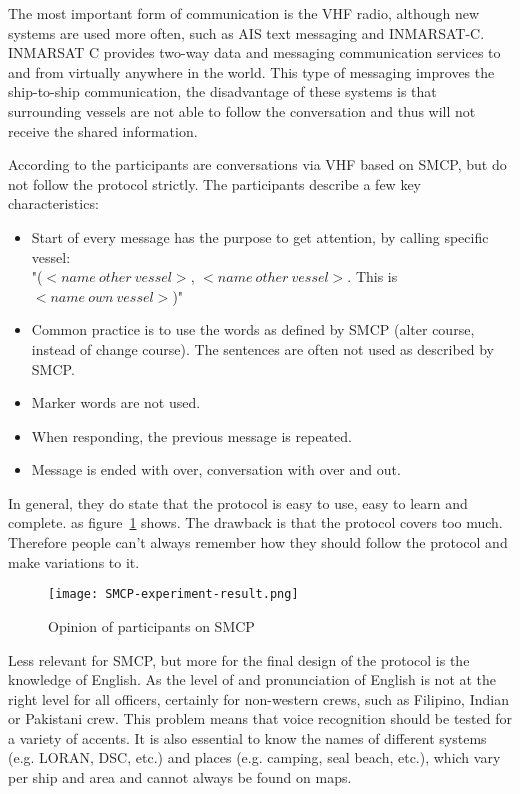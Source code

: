 The most important form of communication is the VHF radio, although new systems are used more often, such as \ac{AIS} text messaging and INMARSAT-C. INMARSAT C provides two-way data and messaging communication services to and from virtually anywhere in the world. This type of messaging improves the ship-to-ship communication, the disadvantage of these systems is that surrounding vessels are not able to follow the conversation and thus will not receive the shared information.

According to the participants are conversations via \ac{VHF} based on \ac{SMCP}, but do not follow the protocol strictly. The participants describe a few key characteristics:
\begin{itemize}
	\item Start of every message has the purpose to get attention, by calling specific vessel: \\ "($<name~other~vessel>$, $<name~other~vessel>$. This is $<name~own~vessel>$)"
	\item Common practice is to use the words as defined by \ac{SMCP} (alter course, instead of change course). The sentences are often not used as described by \ac{SMCP}.
	\item Marker words are not used.
	\item When responding, the previous message is repeated.
	\item Message is ended with over, conversation with over and out.
\end{itemize}
In general, they do state that the protocol is easy to use, easy to learn and complete. as figure~\ref{fig:SMCP-experiment-result} shows. The drawback is that the protocol covers too much. Therefore people can't always remember how they should follow the protocol and make variations to it. 

\begin{figure}[h]
	\centering
	\texttt{[image: SMCP-experiment-result.png]}
	\caption{Opinion of participants on SMCP}
	\label{fig:SMCP-experiment-result}
\end{figure}

Less relevant for \ac{SMCP}, but more for the final design of the protocol is the knowledge of English. As the level of and pronunciation of English is not at the right level for all officers, certainly for non-western crews, such as Filipino, Indian or Pakistani crew. This problem means that voice recognition should be tested for a variety of accents. It is also essential to know the names of different systems (e.g. LORAN, DSC, etc.) and places (e.g. camping, seal beach, etc.), which vary per ship and area and cannot always be found on maps.

